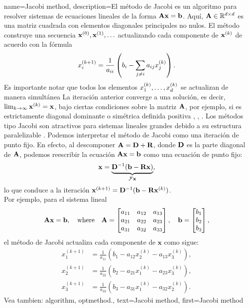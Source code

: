 {name={Jacobi method},
	description={El método de Jacobi es un algoritmo
	para resolver sistemas de ecuaciones lineales de la forma ${\bf A}{\bf x} = \mathbf{b}$. 
	Aquí, ${\bf A} \in \mathbb{R}^{d \times d}$ es una matriz cuadrada con 
	elementos diagonales principales no nulos. El método construye una secuencia 
	${\bf x}^{(0)}, {\bf x}^{(1)}, \ldots$ actualizando cada componente de $\mathbf{x}^{(k)}$ 
	de acuerdo con la fórmula
		\[
		x_i^{(k+1)} = \frac{1}{a_{ii}} \left( b_i - \sum_{j \neq i} a_{ij} x_j^{(k)} \right).
		\]
		Es importante notar que todos los elementos $x^{(k)}_{1}, \ldots, x^{(k)}_{d}$ 
		se actualizan de manera simultánea
		La iteración anterior converge a una solución, es decir, 
		$\lim_{k \rightarrow \infty} {\bf x}^{(k)} = {\bf x}$, 
		bajo ciertas condiciones sobre la matriz ${\bf A}$, por ejemplo, si es 
		estrictamente diagonal dominante o simétrica definida positiva \cite{GolubVanLoanBook}, 
		\cite{Horn91}, \cite{StrangLinAlg2016}. 
		Los métodos tipo Jacobi son atractivos para sistemas lineales grandes 
		debido a su estructura paralelizable \cite{ParallelDistrBook}. 
		Podemos interpretar el método de Jacobi como una iteración de punto fijo. 
		En efecto, al descomponer ${\bf A} = {\bf D} + {\bf R}$, donde ${\bf D}$ es la parte diagonal de ${\bf A}$, 
		podemos reescribir la ecuación ${\bf A} {\bf x} = {\bf b}$ como una ecuación de punto fijo: 
		\[
		\mathbf{x} = \underbrace{{\bf D}^{-1}(\mathbf{b} - {\bf R} \mathbf{x})}_{\mathcal{F} {\bf x}},
		\]
		lo que conduce a la iteración ${\bf x}^{(k+1)} = {\bf D}^{-1}(\mathbf{b} - {\bf R} {\bf x}^{(k)})$.
		\\
		Por ejemplo, para el sistema lineal 
		 \[
		 {\bf A} \mathbf{x} = \mathbf{b}, \quad \text{where} \quad
		 {\bf A} = \begin{bmatrix}
		 	a_{11} & a_{12} & a_{13} \\
		 	a_{21} & a_{22} & a_{23} \\
		 	a_{31} & a_{32} & a_{33}
		 \end{bmatrix}, \quad
		 \mathbf{b} = \begin{bmatrix}
		 	b_1 \\
		 	b_2 \\
		 	b_3
		 \end{bmatrix},
		 \]
		 el método de Jacobi actualiza cada componente de \( \mathbf{x} \) como sigue:
		 \[
		 \begin{aligned}
		 	x_1^{(k+1)} &= \frac{1}{a_{11}} \left( b_1 - a_{12} x_2^{(k)} - a_{13} x_3^{(k)} \right), \\
		 	x_2^{(k+1)} &= \frac{1}{a_{22}} \left( b_2 - a_{21} x_1^{(k)} - a_{23} x_3^{(k)} \right), \\
		 	x_3^{(k+1)} &= \frac{1}{a_{33}} \left( b_3 - a_{31} x_1^{(k)} - a_{32} x_2^{(k)} \right).
		 \end{aligned}
		 \]
		Vea tambien: \gls{algorithm}, \gls{optmethod}.},
	text={Jacobi method}, 
	first={Jacobi method}
}
	
